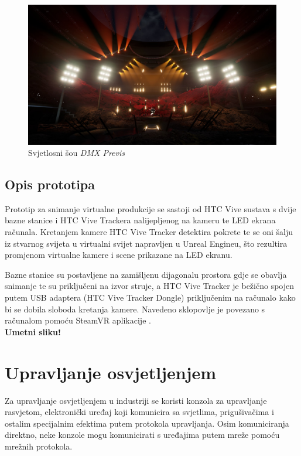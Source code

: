 \documentclass[times, utf8, zavrsni, numeric]{fer}
\begin{document}
\begin{figure}[htp]
	\centering
	\includegraphics[width=\linewidth]{slika 2-4.png}
	\caption{Svjetlosni šou \emph{DMX Previs} \cite{dmx_previs}}
	\label{fig:slika 2-4}
\end{figure}

\pagebreak

\section{Opis prototipa}
Prototip za snimanje virtualne produkcije se sastoji od HTC Vive sustava s dvije bazne stanice i HTC Vive Trackera nalijepljenog na kameru te LED ekrana računala. Kretanjem kamere HTC Vive Tracker detektira pokrete te se oni šalju iz stvarnog svijeta u virtualni svijet napravljen u Unreal Engineu, što rezultira promjenom virtualne kamere i scene prikazane na LED ekranu.\newline

Bazne stanice su postavljene na zamišljenu dijagonalu prostora gdje se obavlja snimanje te su priključeni na izvor struje, a HTC Vive Tracker je bežično spojen putem USB adaptera (HTC Vive Tracker Dongle) priključenim na računalo kako bi se dobila sloboda kretanja kamere. Navedeno sklopovlje je povezano s računalom pomoću SteamVR aplikacije \cite{vp}.\\

\textbf{Umetni sliku!}

\chapter{Upravljanje osvjetljenjem}
Za upravljanje osvjetljenjem u industriji se koristi konzola za upravljanje rasvjetom, elektronički uređaj koji komunicira sa svjetlima, prigušivačima i ostalim specijalnim efektima putem protokola upravljanja. Osim komuniciranja direktno, neke konzole mogu komunicirati s uređajima putem mreže pomoću mrežnih protokola.
\end{document}
